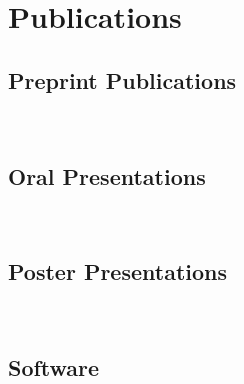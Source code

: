 \documentclass[10pt, letterpaper]{article}
\newcommand{\LastName}{Mishra}
\newcommand{\Initials}{PK}
\newcommand{\Me}{\textbf{\LastName, \Initials}}  %
\newcommand{\DOI}[1]{doi:\href{https://doi.org/#1}{#1}}
\newcommand{\GitHub}[1]{\href{https://github.com/#1}{\faGithub}}
\newcommand{\SlidesDOI}[1]{\href{https://doi.org/#1}{\faTv}}
\newcommand{\Year}[1]{\fontsize{9pt}{0}\selectfont #1}
\begin{document}
\section{Publications}

\subsection{Preprint Publications}
\begin{refsection}
~\nocite{*}
\printbibliography[heading=none, keyword={preprint}]
\end{refsection}

\subsection{Oral Presentations}
\begin{refsection}
~\nocite{*}
\printbibliography[heading=none, keyword={Oral-Presentation}]
\end{refsection}

\subsection{Poster Presentations}
\begin{refsection}
~\nocite{*}
\printbibliography[heading=none, keyword={Poster-Presentation}]
\end{refsection}

\subsection{Software}
\begin{refsection}
~\nocite{*}
\printbibliography[heading=none, keyword={Software}]
\end{refsection}
\end{document}
